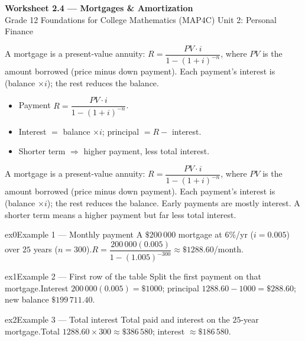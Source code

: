 \documentclass[11pt]{article}
\begin{document}
\begin{center}
{\LARGE\bfseries\color{titleblue}Worksheet 2.4 --- Mortgages \& Amortization}\\[2pt]
{\small Grade 12 Foundations for College Mathematics (MAP4C) \textperiodcentered{} Unit 2: Personal Finance}
\end{center}

\begin{ideabox}
A mortgage is a present-value annuity: $R=\dfrac{PV\cdot i}{1-(1+i)^{-n}}$, where $PV$ is the amount borrowed (price minus down payment). Each payment's interest is (balance $\times i$); the rest reduces the balance.
\begin{itemize}[leftmargin=*,itemsep=2pt]
  \item Payment $R=\dfrac{PV\cdot i}{1-(1+i)^{-n}}$.
  \item Interest $=$ balance $\times i$; principal $=R-$ interest.
  \item Shorter term $\Rightarrow$ higher payment, less total interest.
\end{itemize}
\end{ideabox}

\begin{learnbox}
A mortgage is a present-value annuity: $R=\dfrac{PV\cdot i}{1-(1+i)^{-n}}$, where $PV$ is the amount borrowed (price minus down payment).
Each payment's interest is (balance $\times i$); the rest reduces the balance. Early payments are mostly interest.
A shorter term means a higher payment but far less total interest.
\end{learnbox}


\begin{example}{ex0}{Example 1 --- Monthly payment}
A $\$200\,000$ mortgage at $6\%$/yr ($i=0.005$) over $25$ years ($n=300$).\soln $R=\dfrac{200\,000(0.005)}{1-(1.005)^{-300}}\approx\$1288.60$/month.
\end{example}

\begin{example}{ex1}{Example 2 --- First row of the table}
Split the first payment on that mortgage.\soln Interest $200\,000(0.005)=\$1000$; principal $1288.60-1000=\$288.60$; new balance $\$199\,711.40$.
\end{example}

\begin{example}{ex2}{Example 3 --- Total interest}
Total paid and interest on the $25$-year mortgage.\soln Total $1288.60\times300\approx\$386\,580$; interest $\approx\$186\,580$.
\end{example}
\end{document}
